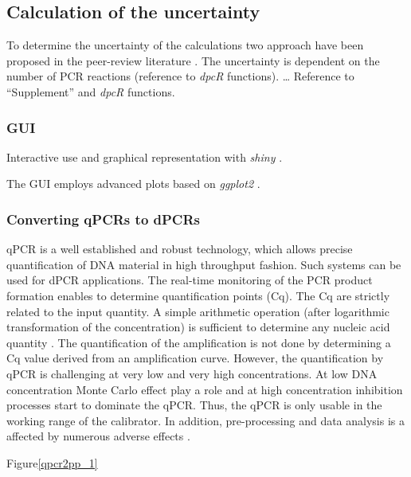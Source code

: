 \documentclass[a4,center,fleqn]{NAR}
\begin{document}
\subsection{Calculation of the uncertainty}

To determine the uncertainty of the calculations two approach have been proposed 
in the peer-review literature \cite{dube_mathematical_2008, bhat_single_2009}. 
The uncertainty is dependent on the number of PCR reactions (reference to 
\textit{\textit{dpcR}} functions). … Reference to ``Supplement'' and 
\textit{dpcR} functions.

\subsubsection{GUI}

Interactive use and graphical representation with \textit{shiny} \cite{shiny}.

The GUI employs advanced plots based on \textit{ggplot2} \cite{kahle_wickham_2013}.

\subsubsection{Converting qPCRs to dPCRs}

qPCR is a well established and robust technology, which allows precise 
quantification of DNA material in high throughput fashion. Such systems can be 
used for dPCR applications. The real-time monitoring of the PCR product 
formation enables to determine quantification points (Cq). The Cq are strictly 
related to the input quantity. A simple arithmetic operation (after logarithmic 
transformation of the concentration) is sufficient to determine any nucleic acid 
quantity \cite{huggett_considerations_2014}. The quantification of the 
amplification is not done by determining a Cq value derived from an 
amplification curve. However, the quantification by qPCR is challenging at very 
low and very high concentrations. At low DNA concentration Monte Carlo effect 
play a role and at high concentration inhibition processes start to dominate the 
qPCR. Thus, the qPCR is only usable in the working range of the calibrator. In 
addition, pre-processing and data analysis is a affected by numerous adverse 
effects \cite{ruijter_2013, pabinger_survey_2014, spiess_impact_2015}.

Figure\ref{qpcr2pp_1}
\end{document}
